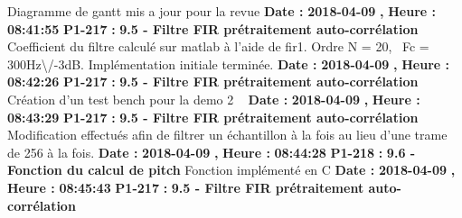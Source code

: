 \documentclass{article}%
\begin{document}
\newline%
%
Diagramme de gantt mis a jour pour la revue\newline%
\newline%
%
\textbf{Date : }%
\textbf{2018{-}04{-}09}%
\textbf{,}%
\textbf{ Heure : }%
\textbf{08:41:55}%
\newline%
%
\textbf{P1{-}217 }%
\textbf{ : }%
\textbf{ 9.5 {-} Filtre FIR prétraitement auto{-}corrélation}%
\newline%
\newline%
%
Coefficient du filtre calculé sur matlab à l'aide de fir1. Ordre N = 20,~ Fc = 300Hz\textbackslash{}/{-}3dB.\newline%
Implémentation initiale terminée.\newline%
\newline%
%
\textbf{Date : }%
\textbf{2018{-}04{-}09}%
\textbf{,}%
\textbf{ Heure : }%
\textbf{08:42:26}%
\newline%
%
\textbf{P1{-}217 }%
\textbf{ : }%
\textbf{ 9.5 {-} Filtre FIR prétraitement auto{-}corrélation}%
\newline%
\newline%
%
Création d'un test bench pour la demo 2\newline%
~\newline%
\newline%
%
\textbf{Date : }%
\textbf{2018{-}04{-}09}%
\textbf{,}%
\textbf{ Heure : }%
\textbf{08:43:29}%
\newline%
%
\textbf{P1{-}217 }%
\textbf{ : }%
\textbf{ 9.5 {-} Filtre FIR prétraitement auto{-}corrélation}%
\newline%
\newline%
%
Modification effectués afin de filtrer un échantillon à la fois au lieu d'une trame de 256 à la fois.\newline%
\newline%
%
\textbf{Date : }%
\textbf{2018{-}04{-}09}%
\textbf{,}%
\textbf{ Heure : }%
\textbf{08:44:28}%
\newline%
%
\textbf{P1{-}218 }%
\textbf{ : }%
\textbf{ 9.6 {-} Fonction du calcul de pitch}%
\newline%
\newline%
%
Fonction implémenté en C\newline%
\newline%
%
\textbf{Date : }%
\textbf{2018{-}04{-}09}%
\textbf{,}%
\textbf{ Heure : }%
\textbf{08:45:43}%
\newline%
%
\textbf{P1{-}217 }%
\textbf{ : }%
\textbf{ 9.5 {-} Filtre FIR prétraitement auto{-}corrélation}%
\end{document}
